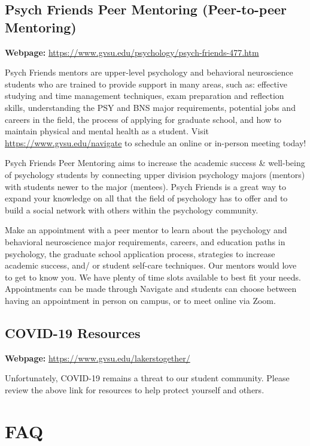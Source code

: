 \documentclass[
  12pt,
  letterpaper,
]{scrartcl}
\begin{document}
\subsection{Psych Friends Peer Mentoring (Peer-to-peer
Mentoring)}\label{psych-friends-peer-mentoring-peer-to-peer-mentoring}

\textbf{Webpage:}
\url{https://www.gvsu.edu/psychology/psych-friends-477.htm}

Psych Friends mentors are upper-level psychology and behavioral
neuroscience students who are trained to provide support in many areas,
such as: effective studying and time management techniques, exam
preparation and reflection skills, understanding the PSY and BNS major
requirements, potential jobs and careers in the field, the process of
applying for graduate school, and how to maintain physical and mental
health as a student. Visit \url{https://www.gvsu.edu/navigate} to
schedule an online or in-person meeting today!

Psych Friends Peer Mentoring aims to increase the academic success \&
well-being of psychology students by connecting upper division
psychology majors (mentors) with students newer to the major (mentees).
Psych Friends is a great way to expand your knowledge on all that the
field of psychology has to offer and to build a social network with
others within the psychology community.

Make an appointment with a peer mentor to learn about the psychology and
behavioral neuroscience major requirements, careers, and education paths
in psychology, the graduate school application process, strategies to
increase academic success, and/ or student self-care techniques. Our
mentors would love to get to know you. We have plenty of time slots
available to best fit your needs. Appointments can be made through
Navigate and students can choose between having an appointment in person
on campus, or to meet online via Zoom.

\subsection{COVID-19 Resources}\label{covid-19-resources}

\textbf{Webpage:} \url{https://www.gvsu.edu/lakerstogether/}

Unfortunately, COVID-19 remains a threat to our student community.
Please review the above link for resources to help protect yourself and
others.

\section{FAQ}\label{faq}
\end{document}
